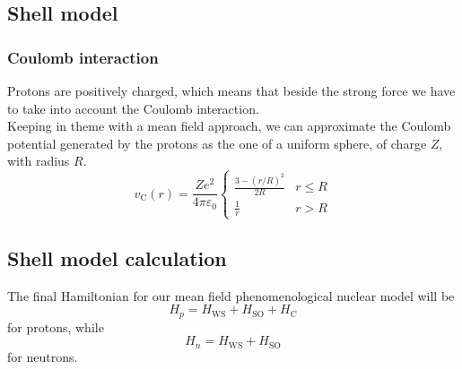 \subsection{Shell model}
\subsubsection{Coulomb interaction}
Protons are positively charged, which means that beside the strong force we have to take into account the Coulomb interaction.
\\Keeping in theme with a mean field approach, we can approximate the Coulomb potential generated by the protons as the one of a uniform sphere, of charge $Z$, with radius $R$.
\begin{equation}
    v_{\text{C}}(r) = \frac{Ze^2}{4\pi\varepsilon_0} 
    \begin{cases}
        \frac{3-(r/R)^2}{2R} & r \le R \\
        \frac 1 r & r > R
    \end{cases}
\end{equation}
\subsection{Shell model calculation}
The final Hamiltonian for our mean field phenomenological nuclear model will be
\begin{equation}
    H_p = H_\text{WS} + H_\text{SO} + H_\text{C}
\end{equation}
for protons, while
\begin{equation}
    H_n = H_\text{WS} + H_\text{SO} 
\end{equation}
for neutrons.
\\

